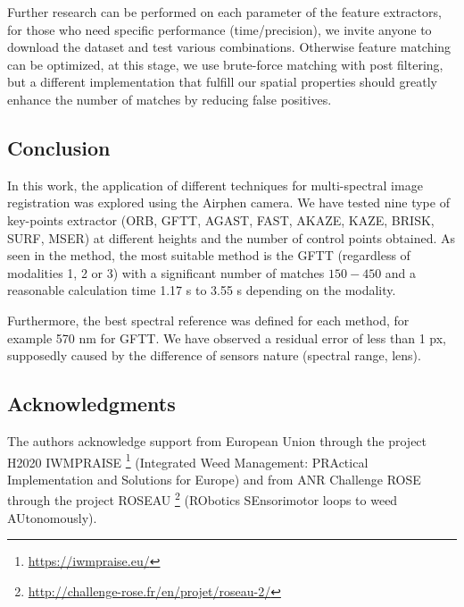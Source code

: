 \documentclass[../thesis.tex]{subfiles}
\begin{document}
	\par Further research can be performed on each parameter of the feature extractors, for those who need specific performance (time/precision),
	we invite anyone to download the dataset and test various combinations.
	Otherwise feature matching can be optimized, at this stage, we use brute-force matching with post filtering,
	but a different implementation that fulfill our spatial properties should greatly enhance the number of matches by reducing false positives.
	
	
	\subsection{Conclusion}
	\label{sec:conclusion}
	
	\par In this work, the application of different techniques for multi-spectral image registration was explored using the Airphen camera.
	We have tested nine type of key-points extractor (ORB, GFTT, AGAST, FAST, AKAZE, KAZE, BRISK, SURF, MSER)
	at different heights and the number of control points obtained.
	As seen in the method, the most suitable method is the GFTT (regardless of modalities 1, 2 or 3)
	with a significant number of matches $150-450$ and a reasonable calculation time 1.17 s to 3.55 s depending on the modality.
	
	\par Furthermore, the best spectral reference was defined for each method, for example 570 nm for GFTT.
	We have observed a residual error of less than 1 px, supposedly caused by the difference of sensors nature (spectral range, lens).
	
	\subsection*{Acknowledgments}
	
	\par The authors acknowledge support from European Union through the project H2020 IWMPRAISE \footnote{\url{https://iwmpraise.eu/}}
	(Integrated Weed Management: PRActical Implementation and Solutions for Europe)
	and from ANR Challenge ROSE through the project ROSEAU \footnote{\url{http://challenge-rose.fr/en/projet/roseau-2/}} (RObotics SEnsorimotor loops to weed AUtonomously).
	
\end{document}
